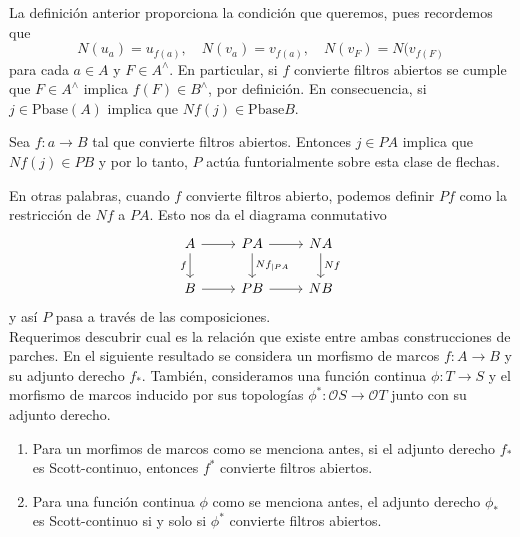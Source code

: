 La definición anterior proporciona la condición que queremos, pues recordemos que 
\[
N(u_a)=u_{f(a)},\quad N(v_a)=v_{f(a)},\quad N(v_F)=N(v_{f(F)}
\]
para cada $a\in A$ y $F\in A^\wedge$. En particular, si $f$ convierte filtros abiertos se cumple que $F\in A^\wedge$ implica $f(F)\in B^\wedge$, por definición. En consecuencia, si $j\in \mbox{Pbase}(A)$ implica que $Nf(j)\in \mbox{Pbase}B$.\\

\begin{lem}\label{Lema7.2.3}
    Sea $f\colon a\to B$ tal que convierte filtros abiertos. Entonces $j\in PA$ implica que $Nf(j)\in PB$ y por lo tanto, $P$ actúa funtorialmente sobre esta clase de flechas.
\end{lem}

En otras palabras, cuando $f$ convierte filtros abierto, podemos definir $Pf$ como la restricción de $Nf$ a $PA$. Esto nos da el diagrama conmutativo
\[\begin{tikzcd}
	A & PA & NA \\
	B & PB & NB
	\arrow[from=1-1, to=1-2]
	\arrow["f"', from=1-1, to=2-1]
	\arrow[from=1-2, to=1-3]
	\arrow["{Nf_{\mid PA}}", from=1-2, to=2-2]
	\arrow["Nf", from=1-3, to=2-3]
	\arrow[from=2-1, to=2-2]
	\arrow[from=2-2, to=2-3]
\end{tikzcd}\]
y así $P$ pasa a través de las composiciones.\\

Requerimos descubrir cual es la relación que existe entre ambas construcciones de parches. En el siguiente resultado se considera un morfismo de marcos $f\colon A\to B$ y su adjunto derecho $f_*$. También, consideramos una función continua $\phi\colon T\to S$ y el morfismo de marcos inducido por sus topologías $\phi^*\colon\mathcal{O}S\to \mathcal{O}T$ junto con su adjunto derecho.\\

\begin{thm}\label{Teorema7.2.4}
    \begin{enumerate}
        \item Para un morfimos de marcos como se menciona antes, si el adjunto derecho $f_*$ es Scott-continuo, entonces $f^*$ convierte filtros abiertos.
        \item Para una función continua $\phi$ como se menciona antes, el adjunto derecho $\phi_*$ es Scott-continuo si y solo si $\phi^*$ convierte filtros abiertos.
    \end{enumerate}
\end{thm}


